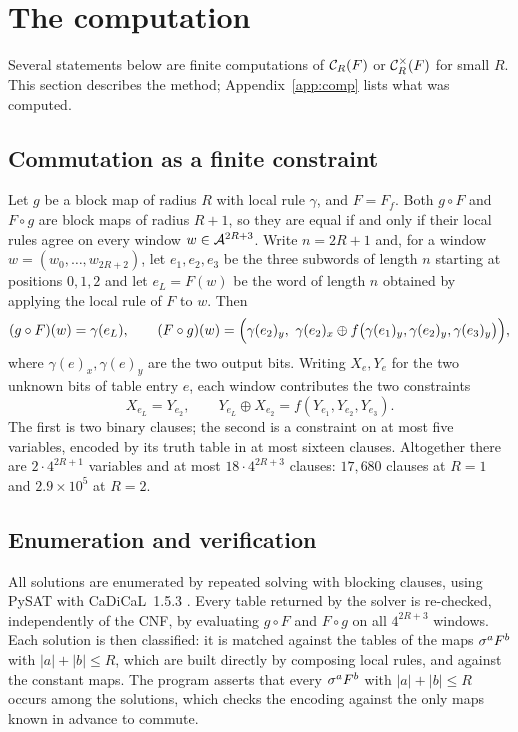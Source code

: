 \section{The computation}\label{sec:method}

Several statements below are finite computations of $\mathcal{C}_R(F)$ or $\mathcal{C}^{\times}_R(F)$ for small $R$. This section describes the method; Appendix~\ref{app:comp} lists what was computed.

\subsection{Commutation as a finite constraint}
Let $g$ be a block map of radius $R$ with local rule $\gamma$, and $F=F_f$. Both $g\circ F$ and $F\circ g$ are block maps of radius $R+1$, so they are equal if and only if their local rules agree on every window $w\in\mathcal{A}^{2R+3}$. Write $n=2R+1$ and, for a window $w=(w_0,\dots,w_{2R+2})$, let $e_1,e_2,e_3$ be the three subwords of length $n$ starting at positions $0,1,2$ and let $e_L=F(w)$ be the word of length $n$ obtained by applying the local rule of $F$ to $w$. Then
\[
(g\circ F)(w)=\gamma(e_L),\qquad (F\circ g)(w)=\Bigl(\gamma(e_2)_y,\ \gamma(e_2)_x\oplus f\bigl(\gamma(e_1)_y,\gamma(e_2)_y,\gamma(e_3)_y\bigr)\Bigr),
\]
where $\gamma(e)_x,\gamma(e)_y$ are the two output bits. Writing $X_e,Y_e$ for the two unknown bits of table entry $e$, each window contributes the two constraints
\begin{equation}\label{eq:constraints}
X_{e_L}=Y_{e_2},\qquad Y_{e_L}\oplus X_{e_2}=f(Y_{e_1},Y_{e_2},Y_{e_3}).
\end{equation}
The first is two binary clauses; the second is a constraint on at most five variables, encoded by its truth table in at most sixteen clauses. Altogether there are $2\cdot4^{2R+1}$ variables and at most $18\cdot4^{2R+3}$ clauses: $17{,}680$ clauses at $R=1$ and $2.9\times10^5$ at $R=2$.

\subsection{Enumeration and verification}
All solutions are enumerated by repeated solving with blocking clauses, using PySAT \cite{PySAT} with CaDiCaL~1.5.3 \cite{CaDiCaL}. Every table returned by the solver is re-checked, independently of the CNF, by evaluating $g\circ F$ and $F\circ g$ on all $4^{2R+3}$ windows. Each solution is then classified: it is matched against the tables of the maps $\sigma^aF^b$ with $|a|+|b|\le R$, which are built directly by composing local rules, and against the constant maps. The program asserts that every $\sigma^aF^b$ with $|a|+|b|\le R$ occurs among the solutions, which checks the encoding against the only maps known in advance to commute.

